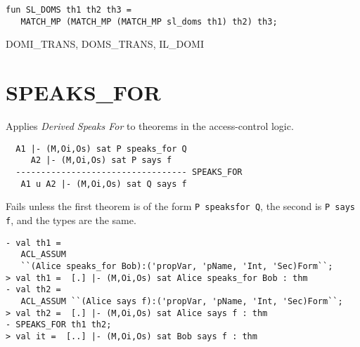\IMPLEMENTATION
\begin{holboxed}
\begin{verbatim}
fun SL_DOMS th1 th2 th3 =
   MATCH_MP (MATCH_MP (MATCH_MP sl_doms th1) th2) th3;
\end{verbatim}
\end{holboxed}

\SEEALSO
DOMI\_TRANS, DOMS\_TRANS, IL\_DOMI
\ENDDOC

\section{SPEAKS\_FOR}



\egroup

\SYNOPSIS
Applies \emph{Derived Speaks For} to theorems in the access-control logic.

\DESCRIBE
\begin{verbatim}
  A1 |- (M,Oi,Os) sat P speaks_for Q
     A2 |- (M,Oi,Os) sat P says f
  ---------------------------------- SPEAKS_FOR
   A1 u A2 |- (M,Oi,Os) sat Q says f
\end{verbatim}

\FAILURE Fails unless the first theorem is of the form \texttt{P
  speaksfor Q}, the second is \texttt{P says f}, and the types are
the same.

\EXAMPLE

\begin{holboxed}
\begin{verbatim}
- val th1 = 
   ACL_ASSUM 
   ``(Alice speaks_for Bob):('propVar, 'pName, 'Int, 'Sec)Form``;
> val th1 =  [.] |- (M,Oi,Os) sat Alice speaks_for Bob : thm
- val th2 = 
   ACL_ASSUM ``(Alice says f):('propVar, 'pName, 'Int, 'Sec)Form``;
> val th2 =  [.] |- (M,Oi,Os) sat Alice says f : thm
- SPEAKS_FOR th1 th2;
> val it =  [..] |- (M,Oi,Os) sat Bob says f : thm
\end{verbatim}
\end{holboxed}

